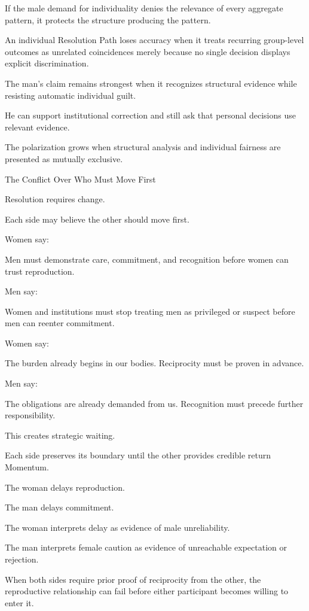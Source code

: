 If the male demand for individuality denies the relevance of every aggregate pattern, it protects the structure producing the pattern.

An individual Resolution Path loses accuracy when it treats recurring group-level outcomes as unrelated coincidences merely because no single decision displays explicit discrimination.

The man’s claim remains strongest when it recognizes structural evidence while resisting automatic individual guilt.

He can support institutional correction and still ask that personal decisions use relevant evidence.

The polarization grows when structural analysis and individual fairness are presented as mutually exclusive.

The Conflict Over Who Must Move First

Resolution requires change.

Each side may believe the other should move first.

Women say:

Men must demonstrate care, commitment, and recognition before women can trust reproduction.

Men say:

Women and institutions must stop treating men as privileged or suspect before men can reenter commitment.

Women say:

The burden already begins in our bodies. Reciprocity must be proven in advance.

Men say:

The obligations are already demanded from us. Recognition must precede further responsibility.

This creates strategic waiting.

Each side preserves its boundary until the other provides credible return Momentum.

The woman delays reproduction.

The man delays commitment.

The woman interprets delay as evidence of male unreliability.

The man interprets female caution as evidence of unreachable expectation or rejection.

When both sides require prior proof of reciprocity from the other, the reproductive relationship can fail before either participant becomes willing to enter it.

